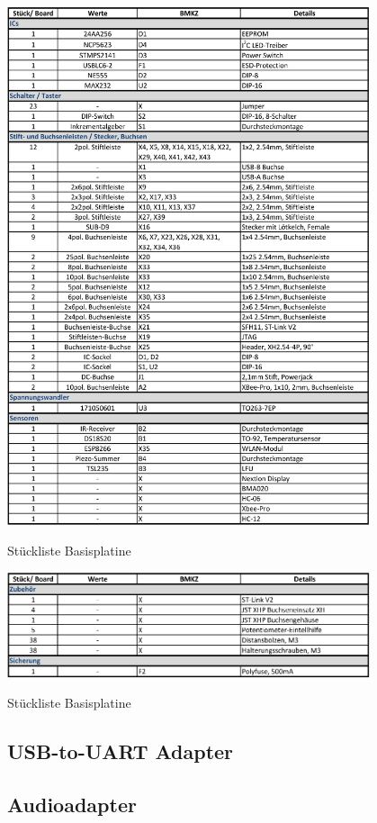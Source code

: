 \begin{table}[H]\ContinuedFloat
    \centering
    \includegraphics[width=0.8\textwidth]{Schuh/Pictures/stuck-basis2}
    \caption[Stückliste Basisplatine]{Stückliste \gls{Basisplatine}}
\end{table}
\begin{table}[H]\ContinuedFloat
    \centering
    \includegraphics[width=0.8\textwidth]{Schuh/Pictures/stuck-basis3}
    \caption[Stückliste Basisplatine]{Stückliste \gls{Basisplatine}}
\end{table}

\subsection{USB-to-UART Adapter}
\label{sec:stücklisten-usbtouart}

\subsection{Audioadapter}
\label{sec:stücklisten-audio}
